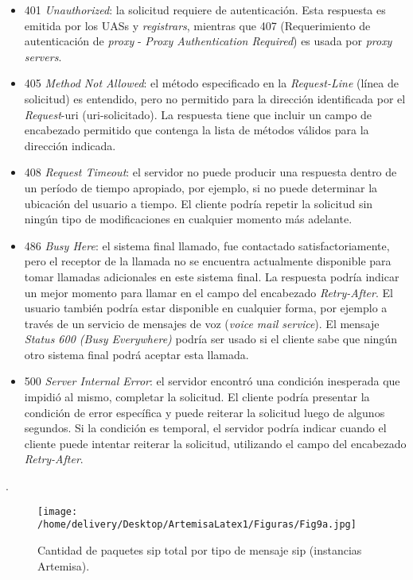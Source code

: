 \documentclass[a4paper,12pt]{report}
\begin{document}
{\begin{itemize}
\item 401 \emph{Unauthorized}:
la solicitud requiere de autenticación. Esta respuesta es emitida por los UASs
y \emph{registrars}, mientras que 407 (Requerimiento de autenticación de \emph{proxy} - \emph{Proxy
Authentication Required}) es usada por \emph{proxy servers}.

\item 405 \emph{Method Not Allowed}:
el método especificado en la \emph{Request-Line} (línea de solicitud) es entendido,
pero no permitido para la dirección identificada por el \emph{Request}-\ac{uri}
(\ac{uri}-solicitado). La respuesta tiene que incluir un campo de encabezado
permitido que contenga la lista de métodos válidos para la dirección indicada.

\item 408 \emph{Request Timeout}:
el servidor no puede producir una respuesta dentro de un período de tiempo
apropiado, por ejemplo, si no puede determinar la ubicación del usuario a
tiempo. El cliente podría repetir la solicitud sin ningún tipo de
modificaciones en cualquier momento más adelante. 

\item 486 \emph{Busy Here}:
el sistema final llamado, fue contactado satisfactoriamente, pero el receptor de
la llamada no se encuentra actualmente disponible para tomar llamadas
adicionales en este sistema final. La respuesta podría indicar un mejor momento
para llamar en el campo del encabezado \emph{Retry-After}. El usuario también
podría estar disponible en cualquier forma, por ejemplo a través de un servicio
de mensajes de voz (\emph{voice mail \mbox{service}}). El mensaje \emph{Status
600 (Busy Everywhere)} podría ser usado si el cliente sabe que ningún otro
sistema final podrá aceptar esta llamada.

\item 500 \emph{Server Internal Error}:
el servidor encontró una condición inesperada que impidió al mismo, 
completar la solicitud. El cliente podría presentar la condición de error
específica y puede reiterar la solicitud luego de algunos segundos. Si la
condición es temporal, el servidor podría indicar cuando el cliente puede
intentar reiterar la solicitud, utilizando el campo del
encabezado \emph{Retry-After}.
\end{itemize}

\cite{rosenberg}.\\

\begin{figure}[h!] 
\centering
\texttt{[image: /home/delivery/Desktop/ArtemisaLatex1/Figuras/Fig9a.jpg]}
\caption{Cantidad de paquetes \ac{sip} total por tipo de mensaje \ac{sip} (instancias Artemisa).}
\label{cant_paq_sip_x_mje_sip_barras_arte}
\end{figure}

}
\end{document}

